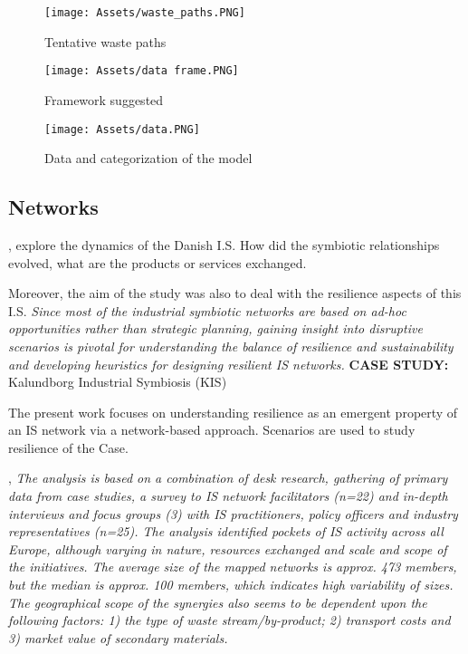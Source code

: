 \begin{figure}[h!]
    \centering
    \texttt{[image: Assets/waste\_paths.PNG]}
    \caption{Tentative waste paths}
    \label{fig:waste_path}
\end{figure}

\begin{figure}[h!]
    \centering
    \texttt{[image: Assets/data frame.PNG]}
    \caption{Framework suggested}
    \label{fig:data}
\end{figure}

\begin{figure}[h!]
    \centering
    \texttt{[image: Assets/data.PNG]}
    \caption{Data and categorization of the model}
    \label{fig:datavars}
\end{figure}

\subsection{Networks}
\textbf{}\par
\textcite{Chopra2014}, explore the dynamics of the Danish I.S. How did the symbiotic relationships evolved, what are the products or services exchanged. \par
Moreover, the aim of the study was also to deal with the resilience aspects of this I.S.
\textit{Since most of the industrial symbiotic networks are based on ad-hoc opportunities rather than strategic planning, gaining insight into disruptive scenarios is pivotal for understanding the balance of resilience and sustainability and developing heuristics for designing resilient IS networks. }
\textbf{CASE STUDY: } Kalundborg Industrial Symbiosis (KIS)

The present work focuses on understanding resilience as an emergent property of an IS network via a network-based approach. Scenarios are used to study resilience of the Case.

\textbf{}\par
\textcite{Domenech2019}, \textit{The analysis is based on a combination of desk research, gathering of primary data from case studies, a survey to IS network facilitators (n=22) and in-depth interviews and focus groups (3) with IS practitioners, policy officers and industry representatives (n=25). The analysis identified pockets of IS activity across all Europe, although varying in nature, resources exchanged and scale and scope of the initiatives. The average size of the mapped networks is approx. 473 members, but the median is approx. 100 members, which indicates high variability of sizes. The geographical scope of the synergies also seems to be dependent upon the following factors: 1) the type of waste stream/by-product; 2) transport costs and 3) market value of secondary materials.}\par

